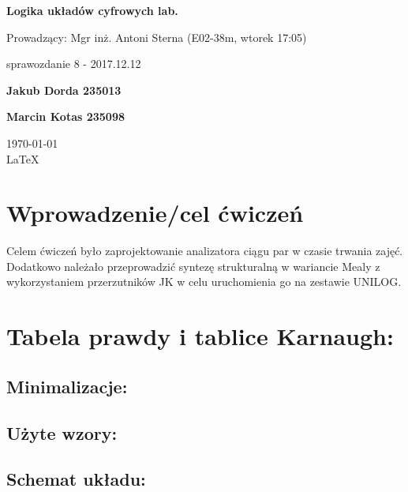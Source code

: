 \documentclass[12pt,a4paper]{article}
\begin{document}
	
	\begin{titlepage}
		
		\centering
		{\huge\bfseries Logika układów cyfrowych lab.\par}
		
		\vspace{0.5cm}
		Prowadzący: Mgr inż. Antoni Sterna (E02-38m, wtorek 17:05) \\
	
		\vspace{1.1cm}
		{\Large sprawozdanie 8 - 2017.12.12\par}
		\vfill
		
		{\large\bfseries Jakub Dorda 235013\par}
		{\large\bfseries Marcin Kotas 235098\par}
		
		\vspace{1cm}
		\today \\ \LaTeX
		
		\restoregeometry
	\end{titlepage}


	\section{Wprowadzenie/cel ćwiczeń}
	
		Celem ćwiczeń było zaprojektowanie analizatora ciągu par w czasie trwania zajęć. Dodatkowo należało przeprowadzić syntezę strukturalną  w wariancie Mealy z wykorzystaniem przerzutników JK w celu uruchomienia go na zestawie UNILOG.
		
	\section{Tabela prawdy i tablice Karnaugh:}
		
		\subsection{Minimalizacje:}
	
		\subsection{Użyte wzory:}
		
		\subsection{Schemat układu:}
		
\end{document}
